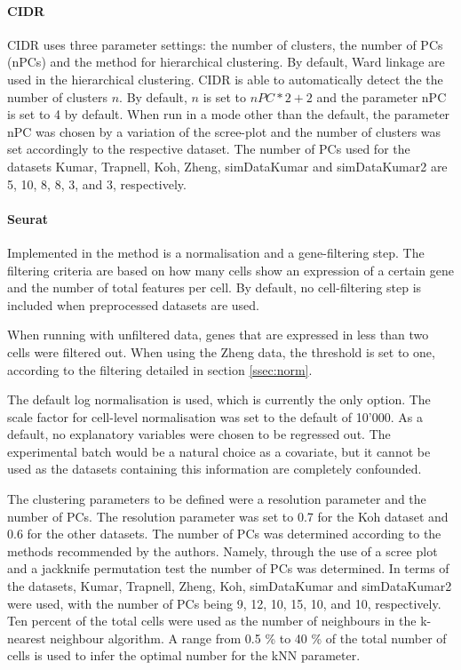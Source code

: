 \documentclass[12pt, a4paper]{article}\usepackage[]{graphicx}\usepackage[]{color}
\begin{document}
\paragraph{CIDR}
CIDR uses three parameter settings: the number of clusters, the number of PCs (nPCs) and the method for hierarchical clustering. By default, Ward linkage are used in the hierarchical clustering. CIDR is able to automatically detect the the number of clusters $n$. By default, $n$ is set to $nPC*2+2$ and the parameter nPC is set to 4 by default. When run in a mode other than the default, the parameter nPC was chosen by a variation of the scree-plot and the number of clusters was set accordingly to the respective dataset. 
The number of PCs used for the datasets Kumar, Trapnell, Koh, Zheng, simDataKumar and simDataKumar2 are  5, 10, 8, 8, 3, and 3, respectively.

\paragraph{Seurat}
Implemented in the method is a normalisation and a gene-filtering step. The filtering criteria are based on how many cells show an expression of a certain gene and the number of total features per cell. By default, no cell-filtering step is included when preprocessed datasets are used.

When running with unfiltered data, genes that are expressed in less than two cells were filtered out. When using the Zheng data, the threshold is set to one, according to the filtering detailed in section \ref{ssec:norm}.

The default log normalisation is used, which is currently the only option. The scale factor for cell-level normalisation was set to the default of 10'000. 
As a default, no explanatory variables were chosen to be regressed out. The experimental batch would be a natural choice as a covariate, but it cannot be used as the datasets containing this information are completely confounded.

The clustering parameters to be defined were a resolution parameter and the number of PCs. The resolution parameter was set to 0.7 for the Koh dataset and 0.6 for the other datasets. 
The number of PCs was determined according to the methods recommended by the authors. Namely, through the use of a scree plot and a jackknife permutation test the number of PCs was determined. 
In terms of the datasets, Kumar, Trapnell, Zheng, Koh, simDataKumar and simDataKumar2 were used, with the number of PCs being  9, 12, 10, 15, 10, and 10, respectively.
Ten percent of the total cells were used as the number of neighbours in the k-nearest neighbour algorithm.  A range from 0.5 \% to 40 \% of the total number of cells is used to infer the optimal number for the kNN parameter.
\end{document}
